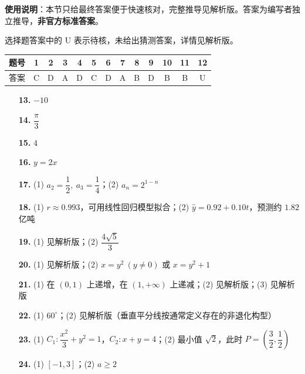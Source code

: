 
\begin{gknotice}
\textbf{使用说明}：本节只给最终答案便于快速核对，完整推导见解析版。答案为编写者独立推导，\textbf{非官方标准答案}。
\end{gknotice}

\begin{gknotice}
选择题答案中的 U 表示待核，未给出猜测答案，详情见解析版。
\end{gknotice}

\begin{center}\begin{tabular}{ccccccccccccc}
\toprule
题号 & 1 & 2 & 3 & 4 & 5 & 6 & 7 & 8 & 9 & 10 & 11 & 12 \\
\midrule
答案 & C & D & A & D & C & D & A & B & D & B & B & U \\
\bottomrule
\end{tabular}\end{center}

\begin{itemize}[leftmargin=2.6em]
  \item[\textbf{13.}] \(-10\)
  \item[\textbf{14.}] \(\dfrac\pi3\)
  \item[\textbf{15.}] \(4\)
  \item[\textbf{16.}] \(y=2x\)
\end{itemize}

\begin{itemize}[leftmargin=2.6em]
  \item[\textbf{17.}] (1) \(a_2=\dfrac12,\ a_3=\dfrac14\)；(2) \(a_n=2^{1-n}\)
  \item[\textbf{18.}] (1) \(r\approx0.993\)，可用线性回归模型拟合；(2) \(\hat y=0.92+0.10t\)，预测约 \(1.82\) 亿吨
  \item[\textbf{19.}] (1) 见解析版；(2) \(\dfrac{4\sqrt5}{3}\)
  \item[\textbf{20.}] (1) 见解析版；(2) \(x=y^2\ (y\ne0)\) 或 \(x=y^2+1\)
  \item[\textbf{21.}] (1) 在 \((0,1)\) 上递增，在 \((1,+\infty)\) 上递减；(2) 见解析版；(3) 见解析版
\end{itemize}

\begin{itemize}[leftmargin=2.6em]
  \item[\textbf{22.}] (1) \(60^\circ\)；(2) 见解析版（垂直平分线按通常定义存在的非退化构型）
  \item[\textbf{23.}] (1) \(C_1:\dfrac{x^2}{3}+y^2=1\)，\(C_2:x+y=4\)；(2) 最小值 \(\sqrt2\)，此时 \(P=(\dfrac32,\dfrac12)\)
  \item[\textbf{24.}] (1) \([-1,3]\)；(2) \(a\ge2\)
\end{itemize}
